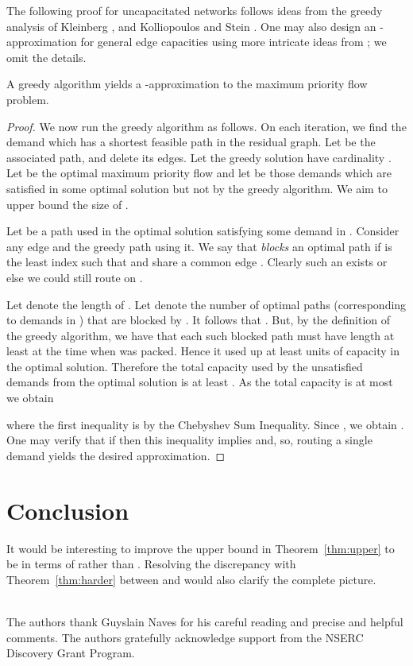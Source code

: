 \documentclass[12pt]{article}
\newcommand{\qed}{}
\begin{document}
 The following proof for uncapacitated networks follows ideas from the greedy analysis of Kleinberg \cite{Kleinberg96},
 and Kolliopoulos and Stein \cite{kolliopoulos2004approximating}. One may also design an -approximation
 for general edge capacities using more intricate ideas from \cite{guruswami2003near}; we omit the details.
\begin{lemma}\label{lem:greedy-priority}
A greedy algorithm yields a -approximation to the  maximum priority flow problem.
\end{lemma}
\begin{proof}
We now run the greedy algorithm as follows. On each iteration, we find the demand  which has a shortest feasible path
 in the residual graph. Let  be the associated path, and delete
its edges. Let the greedy solution have cardinality .
 Let  be the optimal maximum priority flow and
let  be those demands which are satisfied in some optimal
solution but not by the greedy algorithm.
We aim to upper bound the size of .

Let  be a path used in the optimal solution satisfying some demand in .
Consider any edge  and the greedy path using it.
 We say that 
{\em blocks} an optimal path  if  is the least index such
that  and  share a common edge .
Clearly such an  exists or else we could still route on .

Let  denote the length of  .
Let  denote the number of optimal paths  (corresponding to
demands in  ) that are blocked by . It follows that
. But, by the definition of the greedy algorithm,
we have that each such blocked path must have length at least 
 at the time when  was packed.
Hence it used up at least  units of capacity in the optimal solution.
Therefore the total capacity used by the unsatisfied demands from the
optimal solution is at least .
As the total capacity is at most  we obtain




\noindent
where the first inequality is by the Chebyshev Sum Inequality.
Since , we obtain
. One may verify that if  then this inequality implies
 and, so, routing a single demand yields the desired approximation.
\qed
\end{proof}



\section{Conclusion}
It would be interesting to improve the upper bound in Theorem~\ref{thm:upper} to be in terms of 
 rather than .
Resolving the discrepancy with Theorem~\ref{thm:harder}
between  and  would also
clarify the complete picture.

\ \\
The authors thank Guyslain Naves for his careful reading and precise and helpful comments.
The authors gratefully acknowledge support from the NSERC Discovery Grant Program. 


\end{document}
